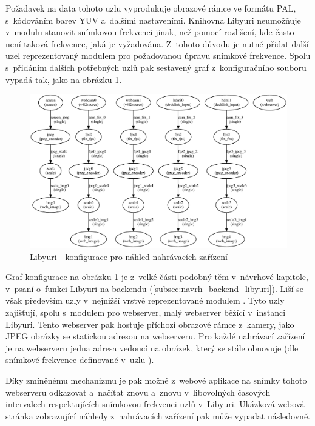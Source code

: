 \documentclass[thesis=M,czech]{FITthesis}[2012/06/26]
\begin{document}
Požadavek na data tohoto uzlu vyprodukuje obrazové rámce ve formátu PAL, s~kódováním barev YUV a~dalšími nastaveními. Knihovna Libyuri neumožňuje v~modulu  stanovit snímkovou frekvenci jinak, než pomocí rozlišení, kde často není taková frekvence, jaká je vyžadována. Z~tohoto důvodu je nutné přidat další uzel reprezentovaný modulem  pro požadovanou úpravu snímkové frekvence. Spolu s~přidáním dalších potřebných uzlů pak sestavený graf z~konfiguračního souboru vypadá tak, jako na obrázku \ref{img:impl_funkce_preview_conf}.
\\
\begin{figure}[h]\centering
	\includegraphics[width=1\textwidth]{images/ulab_cam_preview.eps}
	\caption{Libyuri - konfigurace pro náhled nahrávacích zařízení}\label{img:impl_funkce_preview_conf}
\end{figure}

Graf konfigurace na obrázku \ref{img:impl_funkce_preview_conf} je z~velké části podobný těm v~návrhové kapitole, v~psaní o~funkci Libyuri na backendu (\ref{subsec:navrh_backend_libyuri}). Liší se však především uzly v~nejnižší vrstvě reprezentované modulem . Tyto uzly zajišťují, spolu s~modulem pro webserver, malý webserver běžící v~instanci Libyuri. Tento webserver pak hostuje příchozí obrazové rámce z~kamery, jako JPEG obrázky se statickou adresou na webserveru. Pro každé nahrávací zařízení je na webserveru jedna adresa vedoucí na obrázek, který se stále obnovuje (dle snímkové frekvence definované v~uzlu ).

Díky zmíněnému mechanizmu je pak možné z~webové aplikace na snímky tohoto webserveru odkazovat a~načítat znovu a~znovu v~libovolných časových intervalech respektujících snímkovou frekvenci uzlů v~Libyuri. Ukázková webová stránka zobrazující náhledy z~nahrávacích zařízení pak může vypadat následovně.\\
\end{document}

